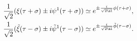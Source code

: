\begin{equation}
\begin{split}
 \frac{1}{\sqrt2} ( \xi (\tau + \sigma) \pm i \psi^1 (\tau + \sigma) ) &\simeq
 e^{ \pm \frac{i}{\sqrt{2 \al}} \phi (\tau + \sigma)}
 , \\
 \frac{1}{\sqrt2} ( \tilde \xi (\tau - \sigma) 
   \pm i \tilde \psi^1 (\tau - \sigma) ) &\simeq
 e^ {\pm \frac{i}{\sqrt{2 \al}} \tilde \phi (\tau - \sigma) } .
\end{split}
\end{equation}


